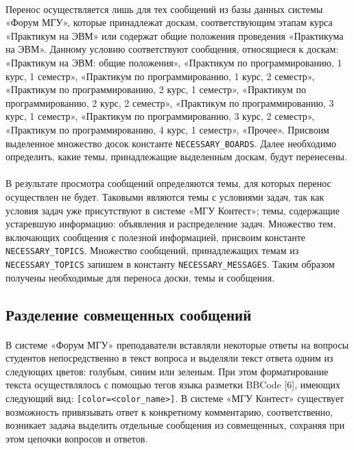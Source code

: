 \documentclass[12pt, a4paper, oneside]{article}
\begin{document}
\paragraph{}
Перенос осуществляется лишь для тех сообщений из базы данных системы «Форум МГУ», которые принадлежат доскам, соответствующим этапам курса «Практикум на ЭВМ» или содержат общие положения проведения «Практикума на ЭВМ». Данному условию соответствуют сообщения, относящиеся к доскам: «Практикум на ЭВМ: общие положения», «Практикум по программированию, 1 курс, 1 семестр», «Практикум по программированию, 1 курс, 2 семестр», «Практикум по программированию, 2 курс, 1 семестр», «Практикум по программированию, 2 курс, 2 семестр», «Практикум по программированию, 3 курс, 1 семестр», «Практикум по программированию, 3 курс, 2 семестр», «Практикум по программированию, 4 курс, 1 семестр», «Прочее». Присвоим выделенное множество досок константе \texttt{NECESSARY\_BOARDS}. Далее необходимо определить, какие темы, принадлежащие выделенным доскам, будут перенесены.
\paragraph{}
В результате просмотра сообщений определяются темы, для которых перенос осуществлен не будет. Таковыми являются темы с условиями задач, так как условия задач уже присутствуют в системе «МГУ Контест»; темы, содержащие устаревшую информацию: объявления и распределение задач. Множество тем, включающих сообщения с полезной информацией, присвоим константе \texttt{NECESSARY\_TOPICS}. Множество сообщений, принадлежащих темам из \texttt{NECESSARY\_TOPICS} запишем в константу \texttt{NECESSARY\_MESSAGES}. Таким образом получены необходимые для переноса доски, темы и сообщения.
\vspace{1cm}

\subsection{Разделение совмещенных сообщений}
\paragraph{}
В системе «Форум МГУ» преподаватели вставляли некоторые ответы на вопросы студентов непосредственно в текст вопроса и выделяли текст ответа одним из следующих цветов: голубым, синим или зеленым. При этом форматирование текста осуществлялось с помощью тегов языка разметки BBCode [6], имеющих следующий вид: \texttt{[color=<color\_name>]}. В системе «МГУ Контест» существует возможность привязывать ответ к конкретному комментарию, соответственно, возникает задача выделить отдельные сообщения из совмещенных, сохраняя при этом цепочки вопросов и ответов.
\end{document}
